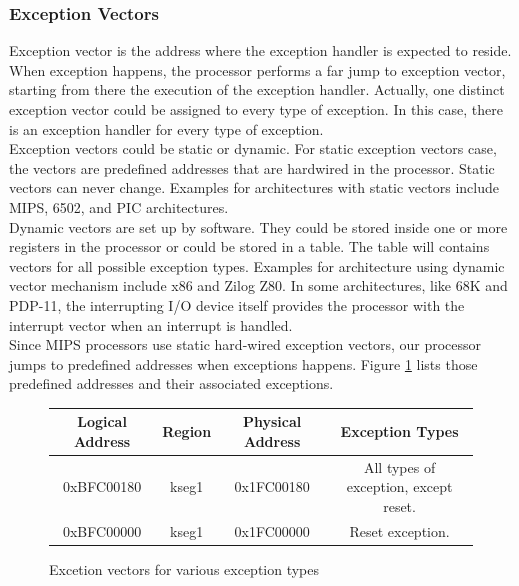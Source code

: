 \documentclass[oneside]{book}
\begin{document}
\subsubsection{Exception Vectors}

Exception vector is the address where the exception handler is expected
to reside. When exception happens, the processor performs a far
jump to exception vector, starting from there the execution of
the exception handler. Actually, one distinct exception vector
could be assigned to every type of exception. In this case,
there is an exception handler for every type of exception.\\

Exception vectors could be static or dynamic. For static exception
vectors case, the vectors are predefined addresses that are hardwired
in the processor. Static vectors can never change. Examples
for architectures with static vectors include MIPS, 6502, and PIC
architectures.\\

Dynamic vectors are set up by software. They could be stored inside
one or more registers in the processor or could be stored in a table.
The table will contains vectors for all possible exception types.
Examples for architecture using dynamic vector mechanism include
x86 and Zilog Z80. In some architectures, like 68K and PDP-11,
the interrupting I/O device itself provides the processor
with the interrupt vector when an interrupt is handled.\\

Since MIPS processors use static hard-wired exception vectors, our
processor jumps to predefined addresses when exceptions happens.
Figure \ref{vectors} lists those predefined addresses and their
associated exceptions.

\begin{figure}[H]
\begin{center}
\begin{tabular}{|c|c|c|c|}

\hline \textbf{Logical Address} & \textbf{Region} &
       \textbf{Physical Address} & \textbf{Exception Types} \\

\hline 0xBFC00180  & kseg1 & 0x1FC00180 & All types of exception, except reset. \\

\hline 0xBFC00000  & kseg1 & 0x1FC00000 & Reset exception.\\

\hline

\end{tabular}
\end{center}
\caption{Excetion vectors for various exception types}
\label{vectors}
\end{figure}
\end{document}

